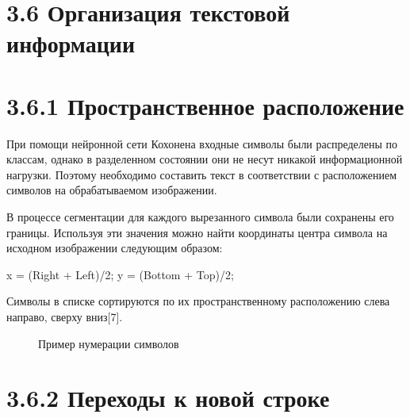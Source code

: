 \documentclass[14pt,a4paper]{extreport}
\begin{document}
                  \section*{\normalsize\hspace{4ex}3.6 Организация текстовой информации} 
                  
            \section*{\normalsize\hspace{4ex}3.6.1 Пространственное расположение} 
                     
 \hspace {4ex} При помощи нейронной сети Кохонена входные символы были распределены по классам, однако в разделенном состоянии они не несут никакой информационной нагрузки. Поэтому необходимо составить текст в соответствии с расположением символов на обрабатываемом изображении. \     
 
 \hspace {4ex} В процессе сегментации для каждого вырезанного символа были сохранены его границы. Используя эти значения можно найти координаты центра символа на исходном изображении следующим образом:

\hspace {4ex} x = (Right + Left)/2;
\hspace {4ex} y = (Bottom + Top)/2;

\hspace {4ex} Символы в списке сортируются по их пространственному расположению слева направо, сверху вниз[7].

\begin{figure}[h!]
\caption{Пример нумерации символов}
\end{figure}

            \section*{\normalsize\hspace{4ex}3.6.2 Переходы к новой строке}
            
\end{document}
